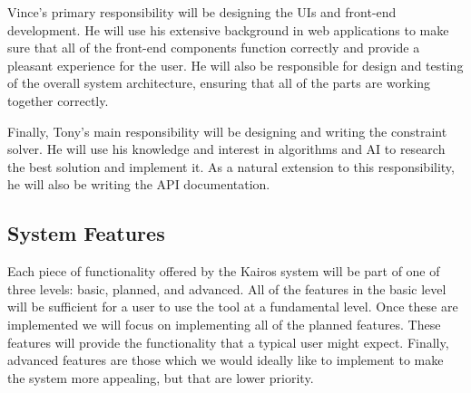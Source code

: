 \documentclass{extarticle}
\begin{document}
Vince's primary responsibility will be designing the UIs and front-end development.  He will use his extensive
background in web applications to make sure that all of the front-end components function correctly and provide a
pleasant experience for the user.  He will also be responsible for design and testing of the overall system
architecture, ensuring that all of the parts are working together correctly.

Finally, Tony's main responsibility will be designing and writing the constraint solver.  He will use his knowledge
and interest in algorithms and AI to research the best solution and implement it.  As a natural extension to this
responsibility, he will also be writing the API documentation.

\subsection{System Features}

Each piece of functionality offered by the Kairos system will be part of one of three levels: basic, planned, and
advanced.  All of the features in the basic level will be sufficient for a user to use the tool at a fundamental
level.  Once these are implemented we will focus on implementing all of the planned features.  These features will
provide the functionality that a typical user might expect.  Finally, advanced features are those which we would
ideally like to implement to make the system more appealing, but that are lower priority.
\end{document}
